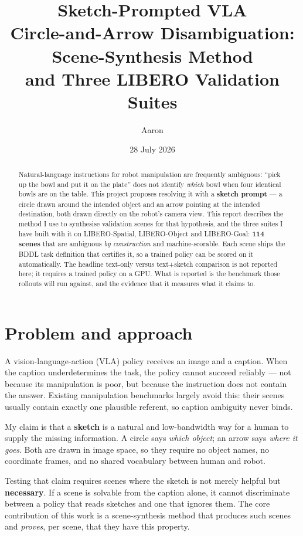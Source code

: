 \documentclass[11pt,a4paper]{article}
\title{\textbf{Sketch-Prompted VLA}\\[2pt]
\large Circle-and-Arrow Disambiguation: Scene-Synthesis Method\\
and Three LIBERO Validation Suites}
\author{Aaron}
\date{28 July 2026}
\begin{document}
\maketitle

\begin{abstract}
\noindent
Natural-language instructions for robot manipulation are frequently ambiguous:
``pick up the bowl and put it on the plate'' does not identify \emph{which} bowl
when four identical bowls are on the table. This project proposes resolving it with
a \textbf{sketch prompt} --- a circle drawn around the intended object and an
arrow pointing at the intended destination, both drawn directly on the robot's
camera view. This report describes the method I use to synthesise validation
scenes for that hypothesis, and the three suites I have built with it on
LIBERO-Spatial, LIBERO-Object and LIBERO-Goal: \textbf{114 scenes} that are
ambiguous \emph{by construction} and machine-scorable. Each scene ships the BDDL
task definition that certifies it, so a trained policy can be scored on it
automatically. The headline text-only versus text+sketch comparison is not
reported here; it requires a trained policy on a GPU. What is reported is the
benchmark those rollouts will run against, and the evidence that it measures
what it claims to.
\end{abstract}

\section{Problem and approach}

A vision-language-action (VLA) policy receives an image and a caption. When the
caption underdetermines the task, the policy cannot succeed reliably --- not
because its manipulation is poor, but because the instruction does not contain
the answer. Existing manipulation benchmarks largely avoid this: their scenes
usually contain exactly one plausible referent, so caption ambiguity never binds.

My claim is that a \textbf{sketch} is a natural and low-bandwidth way for
a human to supply the missing information. A circle says \emph{which object}; an
arrow says \emph{where it goes}. Both are drawn in image space, so they require
no object names, no coordinate frames, and no shared vocabulary between human and
robot.

Testing that claim requires scenes where the sketch is not merely helpful but
\textbf{necessary}. If a scene is solvable from the caption alone, it cannot
discriminate between a policy that reads sketches and one that ignores them. The
core contribution of this work is a scene-synthesis method that produces such
scenes and \emph{proves}, per scene, that they have this property.
\end{document}
